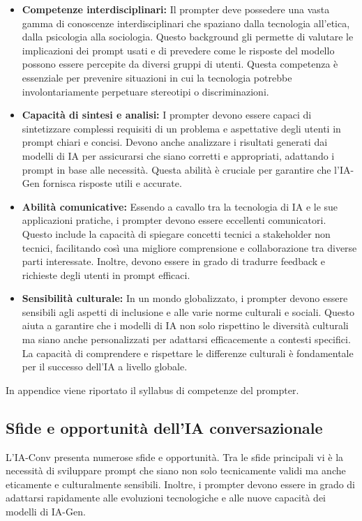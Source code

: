    \begin{itemize}
      \item \textbf{Competenze interdisciplinari:} Il prompter deve possedere una vasta gamma di conoscenze interdisciplinari che spaziano dalla tecnologia all'etica, dalla psicologia alla sociologia. Questo background gli permette di valutare le implicazioni dei prompt usati e di prevedere come le risposte del modello possono essere percepite da diversi gruppi di utenti. Questa competenza è essenziale per prevenire situazioni in cui la tecnologia potrebbe involontariamente perpetuare stereotipi o discriminazioni.
      \item \textbf{Capacità di sintesi e analisi:} I prompter devono essere capaci di sintetizzare complessi requisiti di un problema e aspettative degli utenti in prompt chiari e concisi. Devono anche analizzare i risultati generati dai modelli di IA per assicurarsi che siano corretti e appropriati, adattando i prompt in base alle necessità. Questa abilità è cruciale per garantire che l'IA-Gen fornisca risposte utili e accurate.
      \item \textbf{Abilità comunicative:} Essendo a cavallo tra la tecnologia di IA e le sue applicazioni pratiche, i prompter devono essere eccellenti comunicatori. Questo include la capacità di spiegare concetti tecnici a stakeholder non tecnici, facilitando così una migliore comprensione e collaborazione tra diverse parti interessate. Inoltre, devono essere in grado di tradurre feedback e richieste degli utenti in prompt efficaci.
      \item \textbf{Sensibilità culturale:} In un mondo globalizzato, i prompter devono essere sensibili agli aspetti di inclusione e alle varie norme culturali e sociali. Questo aiuta a garantire che i modelli di IA non solo rispettino le diversità culturali ma siano anche personalizzati per adattarsi efficacemente a contesti specifici. La capacità di comprendere e rispettare le differenze culturali è fondamentale per il successo dell'IA a livello globale.
    \end{itemize}
    In appendice viene riportato il syllabus di competenze del prompter.
 
    \subsection{Sfide e opportunità dell’IA conversazionale}
    L’IA-Conv presenta numerose sfide e opportunità. Tra le sfide principali vi è la necessità di sviluppare prompt che siano non solo tecnicamente validi ma anche eticamente e culturalmente sensibili. Inoltre, i prompter devono essere in grado di adattarsi rapidamente alle evoluzioni tecnologiche e alle nuove capacità dei modelli di IA-Gen.

